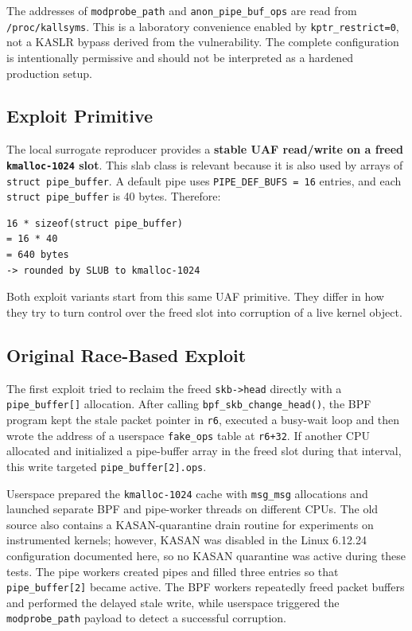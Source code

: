 \documentclass[../main.tex]{subfiles}
\begin{document}
The addresses of \texttt{modprobe\_path} and \texttt{anon\_pipe\_buf\_ops} are read from \texttt{/proc/kallsyms}. This is a laboratory convenience enabled by \texttt{kptr\_restrict=0}, not a KASLR bypass derived from the vulnerability. The complete configuration is intentionally permissive and should not be interpreted as a hardened production setup.

\subsection{Exploit Primitive}

The local surrogate reproducer provides a \textbf{stable UAF read/write on a freed \texttt{kmalloc-1024} slot}. This slab class is relevant because it is also used by arrays of \texttt{struct pipe\_buffer}. A default pipe uses \texttt{PIPE\_DEF\_BUFS = 16} entries, and each \texttt{struct pipe\_buffer} is 40 bytes. Therefore:

\begin{lstlisting}[caption={\texttt{pipe\_buffer} allocation size.}]
16 * sizeof(struct pipe_buffer)
= 16 * 40
= 640 bytes
-> rounded by SLUB to kmalloc-1024
\end{lstlisting}

Both exploit variants start from this same UAF primitive. They differ in how they try to turn control over the freed slot into corruption of a live kernel object.

\subsection{Original Race-Based Exploit}

The first exploit tried to reclaim the freed \texttt{skb->head} directly with a \texttt{pipe\_buffer[]} allocation. After calling \texttt{bpf\_skb\_change\_head()}, the BPF program kept the stale packet pointer in \texttt{r6}, executed a busy-wait loop and then wrote the address of a userspace \texttt{fake\_ops} table at \texttt{r6+32}. If another CPU allocated and initialized a pipe-buffer array in the freed slot during that interval, this write targeted \texttt{pipe\_buffer[2].ops}.

Userspace prepared the \texttt{kmalloc-1024} cache with \texttt{msg\_msg} allocations and launched separate BPF and pipe-worker threads on different CPUs. The old source also contains a KASAN-quarantine drain routine for experiments on instrumented kernels; however, KASAN was disabled in the Linux 6.12.24 configuration documented here, so no KASAN quarantine was active during these tests. The pipe workers created pipes and filled three entries so that \texttt{pipe\_buffer[2]} became active. The BPF workers repeatedly freed packet buffers and performed the delayed stale write, while userspace triggered the \texttt{modprobe\_path} payload to detect a successful corruption.
\end{document}
